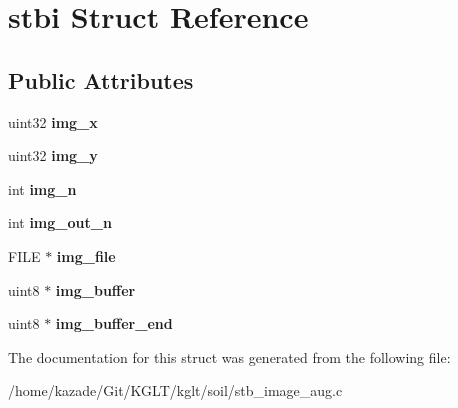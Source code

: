 \hypertarget{structstbi}{\section{stbi Struct Reference}
\label{structstbi}
}
\subsection*{Public Attributes}
\begin{DoxyCompactItemize}
\item 
\hypertarget{structstbi_af3b42c257fb0d8896f29ca3921540a42}{uint32 {\bfseries img\-\_\-x}}\label{structstbi_af3b42c257fb0d8896f29ca3921540a42}

\item 
\hypertarget{structstbi_a60cb5a630e268b2d12306c6eca246dd1}{uint32 {\bfseries img\-\_\-y}}\label{structstbi_a60cb5a630e268b2d12306c6eca246dd1}

\item 
\hypertarget{structstbi_ae22cfcc23f5ab67bede22942333ecbd7}{int {\bfseries img\-\_\-n}}\label{structstbi_ae22cfcc23f5ab67bede22942333ecbd7}

\item 
\hypertarget{structstbi_a33f6519d8f99b84afbde795dc7a931f2}{int {\bfseries img\-\_\-out\-\_\-n}}\label{structstbi_a33f6519d8f99b84afbde795dc7a931f2}

\item 
\hypertarget{structstbi_ae543edaa9f3668b09ef14bd6e882b1ec}{F\-I\-L\-E $\ast$ {\bfseries img\-\_\-file}}\label{structstbi_ae543edaa9f3668b09ef14bd6e882b1ec}

\item 
\hypertarget{structstbi_aace36d5487a596bea5faa0aef0398ac8}{uint8 $\ast$ {\bfseries img\-\_\-buffer}}\label{structstbi_aace36d5487a596bea5faa0aef0398ac8}

\item 
\hypertarget{structstbi_a55f78565e605f1784d47fc9acea475f3}{uint8 $\ast$ {\bfseries img\-\_\-buffer\-\_\-end}}\label{structstbi_a55f78565e605f1784d47fc9acea475f3}

\end{DoxyCompactItemize}


The documentation for this struct was generated from the following file\-:\begin{DoxyCompactItemize}
\item 
/home/kazade/\-Git/\-K\-G\-L\-T/kglt/soil/stb\-\_\-image\-\_\-aug.\-c\end{DoxyCompactItemize}
